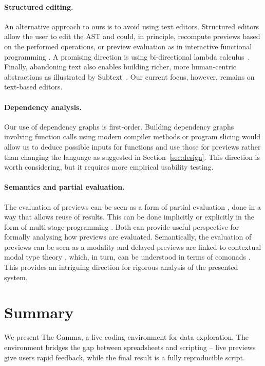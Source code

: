 \documentclass[sigplan,10pt]{acmart}\settopmatter{printfolios=true,printccs=false,printacmref=false}
\theoremstyle{plain}
\theoremstyle{definition}
\begin{document}
\paragraph{Structured editing.}
An alternative approach to ours is to avoid using text editors. Structured editors 
\cite{structure-based} allow the user to edit the AST and could, in principle, recompute previews
based on the performed operations, or preview evaluation as in interactive functional programming
\cite{interactive}. A promising direction is using bi-directional lambda calculus~\cite{hazelnut}. 
Finally, abandoning text also enables building richer, more human-centric 
abstractions as illustrated by Subtext~\cite{subtext}. Our current focus, however, remains
on text-based editors.

\paragraph{Dependency analysis.}
Our use of dependency graphs \cite{dependencies} is first-order. Building dependency graphs 
involving function calls using modern compiler methods \cite{optimizing} or program slicing 
\cite{slicing} would allow us to deduce possible inputs for functions and use those for 
previews rather than changing the language as suggested in Section~\ref{sec:design}. This direction
is worth considering, but it requires more empirical usability testing.

\paragraph{Semantics and partial evaluation.}
The evaluation of previews can be seen as a form of partial evaluation \cite{partial}, done in a
way that allows reuse of results. This can be done implicitly or explicitly in the form of 
multi-stage programming \cite{metaml}. Both can provide useful perspective for formally analysing
how previews are evaluated. Semantically, the evaluation of previews can be seen as a modality
\cite{modal} and delayed previews are linked to contextual modal type theory \cite{cmtt}, which, 
in turn, can be understood in terms of comonads \cite{cmtt-denotation}. This provides an intriguing
direction for rigorous analysis of the presented system.


\section{Summary}
We present The Gamma, a live coding environment for data exploration. The environment
bridges the gap between spreadsheets and scripting -- live previews give users rapid feedback, 
while the final result is a fully reproducible script.
\end{document}
